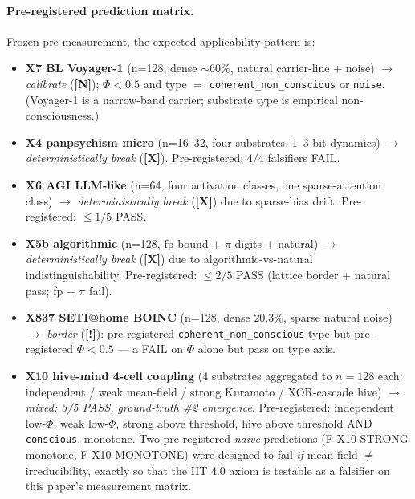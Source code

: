 \documentclass[11pt,a4paper]{article}
\providecommand{\tierGreen}{\textbf{[N]}}   %
\providecommand{\tierRed}{\textbf{[X]}}     %
\providecommand{\tierYellow}{\textbf{[!]}}  %
\begin{document}
\paragraph{Pre-registered prediction matrix.} Frozen pre-measurement, the
expected applicability pattern is:

\begin{itemize}
  \item \textbf{X7 BL Voyager-1} (n=128, dense $\sim 60\%$, natural
    carrier-line + noise) $\to$ \emph{calibrate} (\tierGreen{}); $\Phi<0.5$
    and type $=$ \texttt{coherent\_non\_conscious} or \texttt{noise}.
    (Voyager-1 is a narrow-band carrier; substrate type is empirical
    non-consciousness.)
  \item \textbf{X4 panpsychism micro} (n=16--32, four substrates,
    1--3-bit dynamics) $\to$ \emph{deterministically break} (\tierRed{}).
    Pre-registered: $4/4$ falsifiers FAIL.
  \item \textbf{X6 AGI LLM-like} (n=64, four activation classes,
    one sparse-attention class) $\to$ \emph{deterministically break}
    (\tierRed{}) due to sparse-bias drift. Pre-registered: $\le 1/5$ PASS.
  \item \textbf{X5b algorithmic} (n=128, fp-bound + $\pi$-digits + natural)
    $\to$ \emph{deterministically break} (\tierRed{}) due to
    algorithmic-vs-natural indistinguishability. Pre-registered: $\le 2/5$
    PASS (lattice border + natural pass; fp + $\pi$ fail).
  \item \textbf{X837 SETI@home BOINC} (n=128, dense $20.3\%$, sparse
    natural noise) $\to$ \emph{border} (\tierYellow{}): pre-registered
    \texttt{coherent\_non\_conscious} type but pre-registered $\Phi<0.5$
    --- a FAIL on $\Phi$ alone but pass on type axis.
  \item \textbf{X10 hive-mind 4-cell coupling}
    (4 substrates aggregated to $n=128$ each: independent / weak
    mean-field / strong Kuramoto / XOR-cascade hive) $\to$
    \emph{mixed: 3/5 PASS, ground-truth \#2 emergence}. Pre-registered:
    independent low-$\Phi$, weak low-$\Phi$, strong above threshold,
    hive above threshold AND \texttt{conscious}, monotone.
    Two pre-registered \emph{naive} predictions (F-X10-STRONG monotone,
    F-X10-MONOTONE) were designed to fail \emph{if} mean-field $\ne$
    irreducibility, exactly so that the IIT 4.0 axiom is testable
    as a falsifier on this paper's measurement matrix.
\end{itemize}
\end{document}
